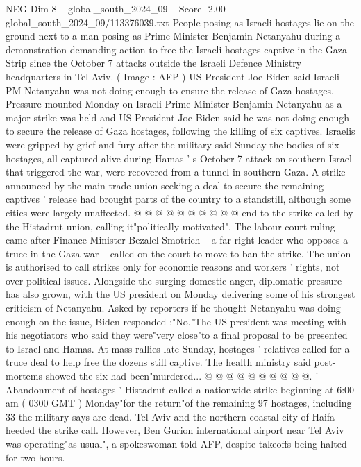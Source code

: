 \begin{textsample}{NEG Dim 8 – global\_south\_2024\_09 – Score -2.00 – global\_south\_2024\_09/113376039.txt}  \label{ex:f8_neg_159}
People posing as Israeli hostages lie on the ground next to a man posing as Prime Minister Benjamin Netanyahu during a demonstration demanding action to free the Israeli hostages captive in the Gaza Strip since the October 7 attacks outside the Israeli Defence Ministry headquarters in Tel Aviv. ( Image : AFP ) US President Joe Biden said Israeli PM Netanyahu was not doing enough to ensure the release of Gaza hostages.
Pressure mounted Monday on Israeli Prime Minister Benjamin Netanyahu as a major strike was held and US President Joe Biden said he was not doing enough to secure the release of Gaza hostages, following the killing of six captives.
Israelis were gripped by grief and fury after the military said Sunday the bodies of six hostages, all captured alive during Hamas ' s October 7 attack on southern Israel that triggered the war, were recovered from a tunnel in southern Gaza.
A strike announced by the main trade union seeking a deal to secure the remaining captives ' release had brought parts of the country to a standstill, although some cities were largely unaffected. @ @ @ @ @ @ @ @ @ @ end to the strike called by the Histadrut union, calling it"politically motivated".
The labour court ruling came after Finance Minister Bezalel Smotrich -- a far-right leader who opposes a truce in the Gaza war -- called on the court to move to ban the strike.
The union is authorised to call strikes only for economic reasons and workers ' rights, not over political issues.
Alongside the surging domestic anger, diplomatic pressure has also grown, with the US president on Monday delivering some of his strongest criticism of Netanyahu.
Asked by reporters if he thought Netanyahu was doing enough on the issue, Biden responded :"No."The US president was meeting with his negotiators who said they were"very close"to a final proposal to be presented to Israel and Hamas.
At mass rallies late Sunday, hostages ' relatives called for a truce deal to help free the dozens still captive.
The health ministry said post-mortems showed the six had been"murdered... @ @ @ @ @ @ @ @ @ @. ' Abandonment of hostages ' Histadrut called a nationwide strike beginning at 6:00 am ( 0300 GMT ) Monday"for the return"of the remaining 97 hostages, including 33 the military says are dead.
Tel Aviv and the northern coastal city of Haifa heeded the strike call.
However, Ben Gurion international airport near Tel Aviv was operating"as usual", a spokeswoman told AFP, despite takeoffs being halted for two hours.

\end{textsample}
